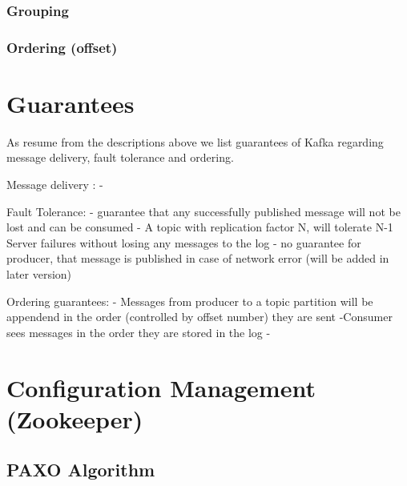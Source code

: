 \subsubsection{Grouping}

\subsubsection{Ordering (offset)}

\section{Guarantees}
\label{kafka-guarantees}
As resume from the descriptions above we list guarantees of Kafka regarding
message delivery, fault tolerance and ordering. 

Message delivery :
- 

Fault Tolerance:
- guarantee that any successfully published message will not be lost and can be
 consumed
- A topic with replication factor N, will tolerate  N-1 Server failures without
losing any messages to the log 
- no guarantee for producer, that message is published in case of network error
(will be added in later version)

Ordering guarantees: 
 - Messages from producer to a topic partition will be appendend in the order
 (controlled by offset number)
 they are sent
 -Consumer sees messages in the order they are stored in the log 
 -

\section{Configuration Management (Zookeeper)}
\subsection{PAXO Algorithm}
